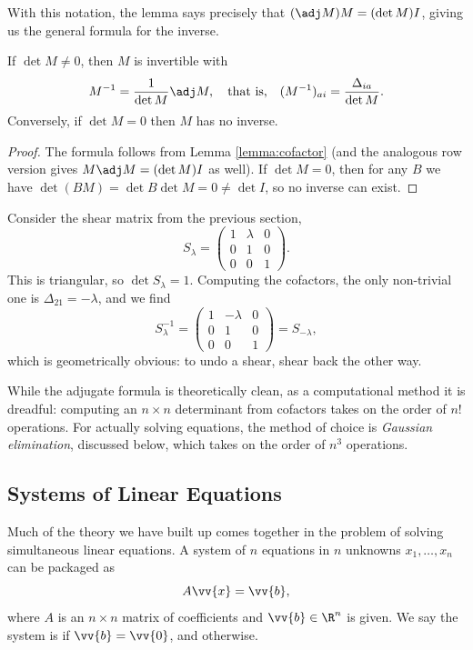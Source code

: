 With this notation, the lemma says precisely that $(\adj M) M = (\det M) I$, giving us the general formula for the inverse.

\begin{theorem}
	If $\det M \neq 0$, then $M$ is invertible with
	$$
	M^{-1} = \frac{1}{\det M} \adj M, \quad \text{that is,} \quad (M^{-1})_{ai} = \frac{\Delta_{ia}}{\det M}.
	$$
	Conversely, if $\det M = 0$ then $M$ has no inverse.
\end{theorem}
\begin{proof}
	The formula follows from Lemma \ref{lemma:cofactor} (and the analogous row version gives $M \adj M = (\det M) I$ as well). If $\det M = 0$, then for any $B$ we have $\det(BM) = \det B \det M = 0 \neq \det I$, so no inverse can exist.
\end{proof}

\begin{example}
	Consider the shear matrix from the previous section,
	$$
	S_\lambda = \begin{pmatrix}
		1 & \lambda & 0 \\
		0 & 1 & 0 \\
		0 & 0 & 1
	\end{pmatrix}.
	$$
	This is triangular, so $\det S_\lambda = 1$. Computing the cofactors, the only non-trivial one is $\Delta_{21} = -\lambda$, and we find
	$$
	S_\lambda^{-1} = \begin{pmatrix}
		1 & -\lambda & 0 \\
		0 & 1 & 0 \\
		0 & 0 & 1
	\end{pmatrix} = S_{-\lambda},
	$$
	which is geometrically obvious: to undo a shear, shear back the other way.
\end{example}

While the adjugate formula is theoretically clean, as a computational method it is dreadful: computing an $n \times n$ determinant from cofactors takes on the order of $n!$ operations. For actually solving equations, the method of choice is \emph{Gaussian elimination}, discussed below, which takes on the order of $n^3$ operations.

\subsection{Systems of Linear Equations}

Much of the theory we have built up comes together in the problem of solving simultaneous linear equations. A system of $n$ equations in $n$ unknowns $x_1, \dots, x_n$ can be packaged as
$$
A \vv{x} = \vv{b},
$$
where $A$ is an $n \times n$ matrix of coefficients and $\vv{b} \in \R^n$ is given. We say the system is  if $\vv{b} = \vv{0}$, and  otherwise.

